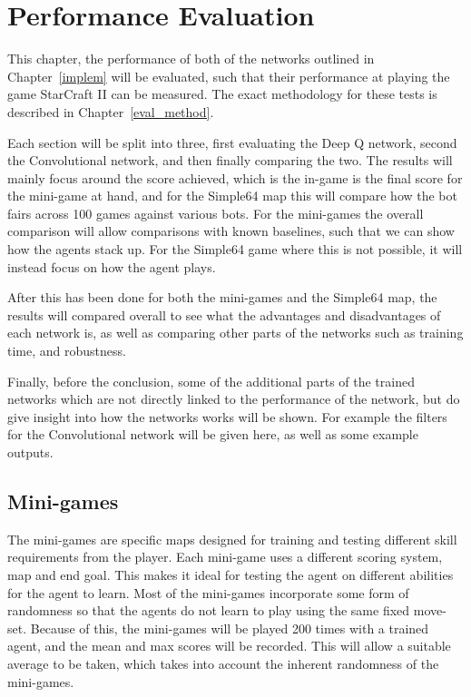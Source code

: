 \chapter{Performance Evaluation}%
\label{eval}

This chapter, the performance of both of the networks outlined in
Chapter~\ref{implem} will be evaluated, such that their performance at playing
the game StarCraft II can be measured. The exact methodology for these tests is
described in Chapter~\ref{eval_method}.

Each section will be split into three, first evaluating the Deep Q network,
second the Convolutional network, and then finally comparing the two. The
results will mainly focus around the score achieved, which is the in-game is the
final score for the mini-game at hand, and for the Simple64 map this will
compare how the bot fairs across 100 games against various bots. For the
mini-games the overall comparison will allow comparisons with known baselines,
such that we can show how the agents stack up. For the Simple64 game where this
is not possible, it will instead focus on how the agent plays.

After this has been done for both the mini-games and the Simple64 map, the
results will compared overall to see what the advantages and disadvantages of
each network is, as well as comparing other parts of the networks such as
training time, and robustness.

Finally, before the conclusion, some of the additional parts of the trained
networks which are not directly linked to the performance of the network, but
do give insight into how the networks works will be shown. For example the
filters for the Convolutional network will be given here, as well as some
example outputs.

\section{Mini-games}

The mini-games are specific maps designed for training and testing different
skill requirements from the player. Each mini-game uses a different scoring
system, map and end goal. This makes it ideal for testing the agent on different
abilities for the agent to learn. Most of the mini-games incorporate some form
of randomness so that the agents do not learn to play using the same fixed
move-set. Because of this, the mini-games will be played 200 times with a
trained agent, and the mean and max scores will be recorded. This will allow a
suitable average to be taken, which takes into account the inherent randomness
of the mini-games.

